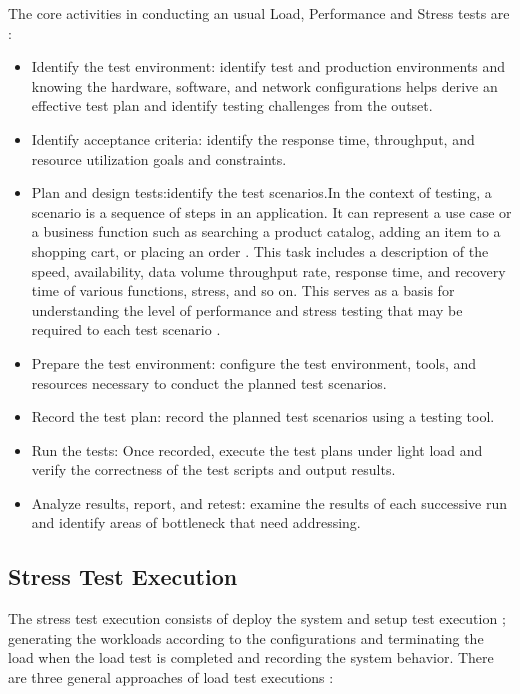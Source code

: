 \documentclass{report}
\begin{document}
The core activities in conducting an usual Load, Performance and Stress tests are \cite{Erinle2013}: 

\begin{itemize}
\item Identify the test environment: identify test and production environments and knowing the hardware, software, and network configurations helps derive an effective test plan and identify testing challenges from the outset.

\item Identify acceptance criteria: identify the response time, throughput, and resource utilization goals and constraints.

\item Plan and design tests:identify the test scenarios.In the context of testing, a scenario is a sequence of steps in an application. It can represent a use case or a business function such as searching a product catalog, adding an item to a shopping cart, or placing an order \cite{Corporation2007}. This task includes a description
of the speed, availability, data volume throughput rate, response
time, and recovery time of various functions, stress, and so on. This
serves as a basis for understanding the level of performance and
stress testing that may be required to each test scenario \cite{Lewis2005}.

\item Prepare the test environment: configure the test environment, tools, and resources necessary to conduct the planned test scenarios.

\item Record the test plan: record the planned test scenarios using a testing tool.

\item Run the tests: Once recorded, execute the test plans under light load and verify the correctness of the test scripts and output results.

\item Analyze results, report, and retest: examine the results of each successive run and identify areas of bottleneck that need addressing.  

\end{itemize}

\subsection{Stress Test Execution}

The stress test execution  consists of deploy the system  and setup test execution ; generating the workloads according to the configurations and terminating the load when the load test is completed and recording the system behavior. There are three general approaches of load test executions \cite{Molyneaux2009}\cite{Jiang2010}:
\end{document}
